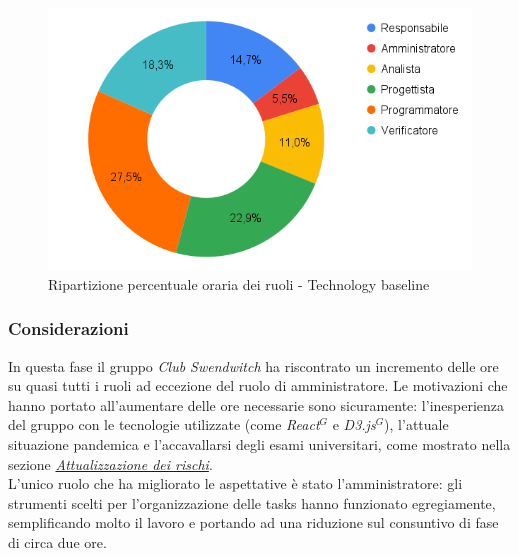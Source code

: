 \begin{figure}[h!]
	\centering
	\includegraphics[scale=0.37]{../../assets/Diagrammi_Excel/torta_ore_TB.png}
	\caption{Ripartizione percentuale oraria dei ruoli - Technology baseline}
\end{figure}

\subsubsection{Considerazioni}
In questa fase il gruppo \textit{Club Swendwitch} ha riscontrato un incremento delle ore su quasi tutti i ruoli ad eccezione del ruolo di amministratore. Le motivazioni che hanno portato all'aumentare delle ore necessarie sono sicuramente: l'inesperienza del gruppo con le tecnologie utilizzate (come \textit{React}$^{G}$ e \textit{D3.js}$^{G}$), 
l'attuale situazione pandemica e l'accavallarsi degli esami universitari, come mostrato nella sezione \hyperref[sec:AttualizzazioneRischi]{\textit{Attualizzazione dei rischi}}.\\
L'unico ruolo che ha migliorato le aspettative è stato l'amministratore: gli strumenti scelti per l'organizzazione delle tasks hanno funzionato egregiamente, semplificando molto il lavoro e portando ad una riduzione sul consuntivo di fase di circa due ore.

